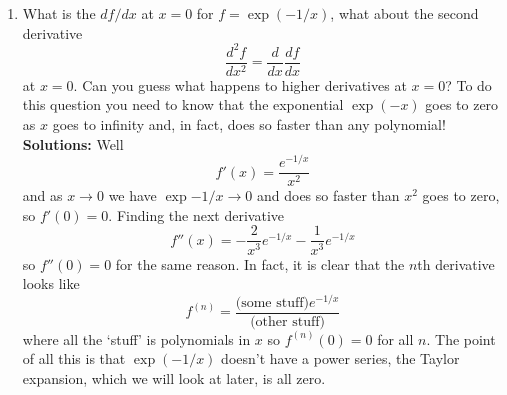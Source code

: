 \documentclass[12pt]{article}
\begin{document}
\begin{enumerate}
\item What is the $df/dx$ at $x=0$ for $f=\exp(-1/x)$, what about the second derivative 
\begin{equation}
\frac{d^2f}{dx^2}=\frac{d}{dx}\frac{df}{dx}
\end{equation}
at $x=0$. Can you guess what happens to higher derivatives at $x=0$?
To do this question you need to know that the exponential $\exp(-x)$
goes to zero as $x$ goes to infinity and, in fact, does so faster than
any polynomial!\\ 
\textbf{Solutions: } Well
\begin{equation}
f'(x)=\frac{e^{-1/x}}{x^2}
\end{equation}
and as $x\rightarrow 0$ we have $\exp{-1/x}\rightarrow 0$ and does so faster than $x^2$ goes to zero, so $f'(0)=0$. Finding the next derivative
\begin{equation}
f''(x)=-\frac{2}{x^3}e^{-1/x}-\frac{1}{x^3}e^{-1/x}
\end{equation}
so $f''(0)=0$ for the same reason. In fact, it is clear that the $n$th derivative looks like
\begin{equation}
f^{(n)}=\frac{\mbox{(some stuff)}e^{-1/x}}{\mbox{(other stuff)}}
\end{equation}
where all the \lq{}stuff\rq{} is polynomials in $x$ so $f^{(n)}(0)=0$
for all $n$. The point of all this is that $\exp(-1/x)$ doesn't have a
power series, the Taylor expansion, which we will look at later, is all zero.


\end{enumerate}
\end{document}
